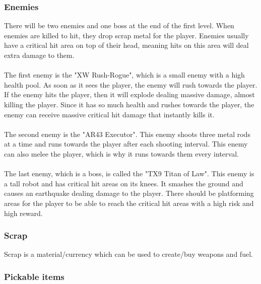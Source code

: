 \documentclass[../Main.tex]{subfiles}
\begin{document}
\subsubsection{Enemies}

 There will be two enemies and one boss at the end of the first level. When enemies are killed to hit, they drop scrap metal for the player. Enemies usually have a critical hit area on top of their head, meaning hits on this area will deal extra damage to them. 

\paragraph{}
The first enemy is the "XW Rush-Rogue", which is a small enemy with a high health pool. As soon as it sees the player, the enemy will rush towards the player. If the enemy hits the player, then it will explode dealing massive damage, almost killing the player. Since it has so much health and rushes towards the player, the enemy can receive massive critical hit damage that instantly kills it.

\paragraph{}
The second enemy is the "AR43 Executor". This enemy shoots three metal rods at a time and runs towards the player after each shooting interval. This enemy can also melee the player, which is why it runs towards them every interval.

\paragraph{}
The last enemy, which is a boss, is called the "TX9 Titan of Law". This enemy is a tall robot and has critical hit areas on its knees. It smashes the ground and causes an earthquake dealing damage to the player. There should be platforming areas for the player to be able to reach the critical hit areas with a high risk and high reward. 

\subsubsection{Scrap}

Scrap is a material/currency which can be used to create/buy weapons and fuel. 

\subsubsection{Pickable items}
\end{document}
